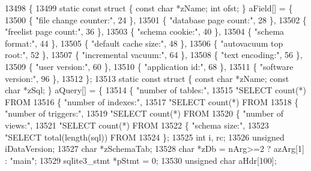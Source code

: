 \begin{DoxyCode}
13498                                                                       \{
13499   \textcolor{keyword}{static} \textcolor{keyword}{const} \textcolor{keyword}{struct }\{ \textcolor{keyword}{const} \textcolor{keywordtype}{char} *zName; \textcolor{keywordtype}{int} ofst; \} aField[] = \{
13500      \{ \textcolor{stringliteral}{"file change counter:"},  24  \},
13501      \{ \textcolor{stringliteral}{"database page count:"},  28  \},
13502      \{ \textcolor{stringliteral}{"freelist page count:"},  36  \},
13503      \{ \textcolor{stringliteral}{"schema cookie:"},        40  \},
13504      \{ \textcolor{stringliteral}{"schema format:"},        44  \},
13505      \{ \textcolor{stringliteral}{"default cache size:"},   48  \},
13506      \{ \textcolor{stringliteral}{"autovacuum top root:"},  52  \},
13507      \{ \textcolor{stringliteral}{"incremental vacuum:"},   64  \},
13508      \{ \textcolor{stringliteral}{"text encoding:"},        56  \},
13509      \{ \textcolor{stringliteral}{"user version:"},         60  \},
13510      \{ \textcolor{stringliteral}{"application id:"},       68  \},
13511      \{ \textcolor{stringliteral}{"software version:"},     96  \},
13512   \};
13513   \textcolor{keyword}{static} \textcolor{keyword}{const} \textcolor{keyword}{struct }\{ \textcolor{keyword}{const} \textcolor{keywordtype}{char} *zName; \textcolor{keyword}{const} \textcolor{keywordtype}{char} *zSql; \} aQuery[] = \{
13514      \{ \textcolor{stringliteral}{"number of tables:"},
13515        \textcolor{stringliteral}{"SELECT count(*) FROM %
13516      \{ \textcolor{stringliteral}{"number of indexes:"},
13517        \textcolor{stringliteral}{"SELECT count(*) FROM %
13518      \{ \textcolor{stringliteral}{"number of triggers:"},
13519        \textcolor{stringliteral}{"SELECT count(*) FROM %
13520      \{ \textcolor{stringliteral}{"number of views:"},
13521        \textcolor{stringliteral}{"SELECT count(*) FROM %
13522      \{ \textcolor{stringliteral}{"schema size:"},
13523        \textcolor{stringliteral}{"SELECT total(length(sql)) FROM %
13524   \};
13525   \textcolor{keywordtype}{int} i, rc;
13526   \textcolor{keywordtype}{unsigned} iDataVersion;
13527   \textcolor{keywordtype}{char} *zSchemaTab;
13528   \textcolor{keywordtype}{char} *zDb = nArg>=2 ? azArg[1] : \textcolor{stringliteral}{"main"};
13529   sqlite3_stmt *pStmt = 0;
13530   \textcolor{keywordtype}{unsigned} \textcolor{keywordtype}{char} aHdr[100];
}}}}}
\end{DoxyCode}
